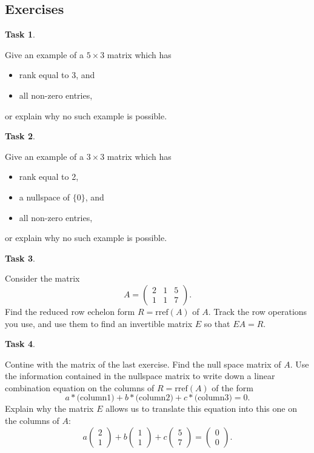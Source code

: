 \documentclass[10pt,]{book}
\theoremstyle{plain}
\theoremstyle{definition}
\numberwithin{equation}{section}
\newtheorem{task}{Task}[chapter]
\begin{document}
\subsection[Exercises]{Exercises}\label{subsection-72}
\begin{task}
\label{task-94}

        Give an example of a \(5 \times 3\) matrix which has
        \begin{itemize}
\item{}rank equal to 3, and\item{}all non-zero entries,\end{itemize}

        or explain why no such example is possible.
      \end{task}
\begin{task}
\label{task-95}

        Give an example of a \(3 \times 3\) matrix which has
        \begin{itemize}
\item{}rank equal to 2,\item{}a nullspace of \(\{0\}\), and\item{}all non-zero entries,\end{itemize}

        or explain why no such example is possible.
      \end{task}
\begin{task}
\label{task-96}

        Consider the matrix \[
        A = \left( \begin{smallmatrix} 2 & 1 & 5 \\ 1 & 1
        & 7 \end{smallmatrix}\right).\]
        Find the reduced row echelon form \(R = \mathrm{rref}(A)\)
        of \(A\). Track the row operations you use, and use them to
        find an invertible matrix \(E\) so that \(EA = R\).
      \end{task}
\begin{task}
\label{task-97}

        Contine with the matrix of the last exercise. Find the null space matrix of
        \(A\). Use the information contained in the nullspace matrix to
        write down a linear combination equation on the columns of
        \(R = \mathrm{rref}(A)\) of the form
        \[
          a * \text{(column1)} + b * \text{(column2)} + c * \text{(column3)} = 0.
        \]
        Explain why the matrix \(E\) allows us to translate this equation
        into this one on the columns of \(A\):
        \[
          a\begin{pmatrix} 2 \\ 1 \end{pmatrix} +
          b \begin{pmatrix} 1 \\ 1 \end{pmatrix} +
          c \begin{pmatrix} 5 \\ 7 \end{pmatrix} =
          \begin{pmatrix}0\\ 0 \end{pmatrix}.
        \]\end{task}
\end{document}
